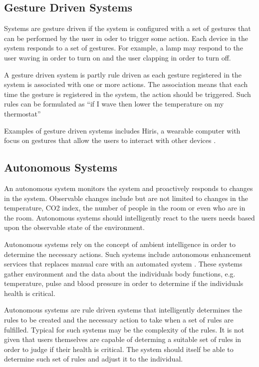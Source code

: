\subsection{Gesture Driven Systems}

Systems are gesture driven if the system is configured with a set of gestures that can be performed by the user in oder to trigger some action. 
Each device in the system responds to a set of gestures. 
For example, a lamp may respond to the user waving in order to turn on and the user clapping in order to turn off.

A gesture driven system is partly rule driven as each gesture registered in the system is associated with one or more actions. 
The association means that each time the gesture is registered in the system, the action should be triggered. 
Such rules can be formulated as ``if I wave then lower the temperature on my thermostat''

Examples of gesture driven systems includes Hiris, a wearable computer with focus on gestures that allow the users to interact with other devices \cite{hirisweb}.

\subsection{Autonomous Systems}

An autonomous system monitors the system and proactively responds to changes in the system. 
Observable changes include but are not limited to changes in the temperature, CO2 index, the number of people in the room or even who are in the room.
Autonomous systems should intelligently react to the users needs based upon the observable state of the environment.

Autonomous systems rely on the concept of ambient intelligence in order to determine the necessary actions. 
Such systems include autonomous enhancement services that replaces manual care with an automated system \cite{nehmer2006living}. 
These systems gather environment and the data about the individuals body functions, 
e.g. temperature, pulse and blood pressure in order to determine if the individuals health is critical.

Autonomous systems are rule driven systems that intelligently determines the rules to be created and the necessary action to take when a set of rules are fulfilled. 
Typical for such systems may be the complexity of the rules. 
It is not given that users themselves are capable of determing a suitable set of rules in order to judge if their health is critical. 
The system should itself be able to determine such set of rules and adjust it to the individual.

